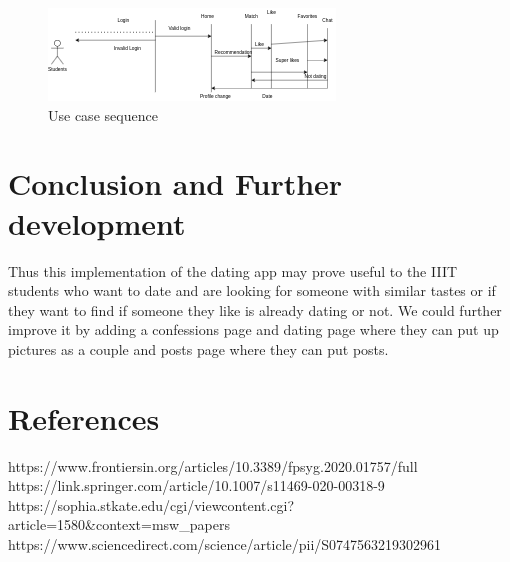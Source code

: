 \documentclass[conference]{IEEEtran}
\begin{document}
\begin{figure}[htbp]
\centerline{\includegraphics{dass_1.drawio (5).png}}
\caption{Use case sequence}
\label{fig}
\end{figure}

\section*{Conclusion and Further development}

Thus this implementation of the dating app may prove useful to the IIIT students who want to date and are looking for someone with similar tastes or if they want to find if someone they like is already dating or not. We could further improve it by adding a confessions page and dating page where they can put up pictures as a couple and posts page where they can put posts.

\section*{References}

https://www.frontiersin.org/articles/10.3389/fpsyg.2020.01757/full
https://link.springer.com/article/10.1007/s11469-020-00318-9
https://sophia.stkate.edu/cgi/viewcontent.cgi?article=1580&context=msw\_papers
https://www.sciencedirect.com/science/article/pii/S0747563219302961
\end{document}
